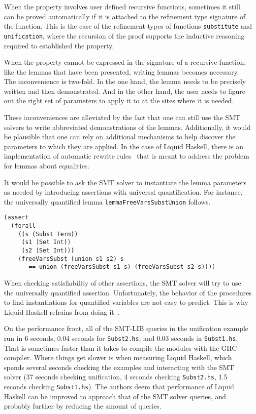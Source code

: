 \documentclass[sigconf, anonymous, review]{acmart}
\newcommand{\tc}[1]{{\small\texttt{#1}}}
\begin{document}
When the property involves user defined recursive functions,
sometimes it still can be proved automatically if it is attached to the
refinement type signature of the function. This is the case of the refinement
types of functions \tc{substitute} and \tc{unification}, where the recursion
of the proof supports the inductive reasoning required to established the
property.

When the property cannot be expressed in the signature of a recursive function,
like the lemmas that have been presented, writing lemmas becomes necessary. The
inconvenience is two-fold. In the one hand, the lemma needs to be precisely
written and then demonstrated. And in the other hand, the user needs to figure
out the right set of parameters to apply it to at the sites where it is needed.

These inconveniences are alleviated by the fact that one can still use the
SMT solvers to write abbreviated demonstrations of the lemmas. Additionally,
it would be plausible that one can rely on additional mechanisms to help
discover the parameters to which they are applied. In the case of Liquid
Haskell, there is an implementation of automatic rewrite rules~\cite{grannan22}
that is meant to address the problem for lemmas about equalities.

It would be possible to ask the SMT solver to instantiate the lemma parameters
as needed by introducing assertions with universal quantification. For instance,
the universally quantified lemma \tc{lemma\-FreeVars\-Subst\-Union} follows.

\begin{verbatim}
(assert
  (forall
    ((s (Subst Term))
     (s1 (Set Int))
     (s2 (Set Int)))
    (freeVarsSubst (union s1 s2) s
       == union (freeVarsSubst s1 s) (freeVarsSubst s2 s))))
\end{verbatim}

When checking satisfiability of other assertions, the SMT solver
will try to use the universally quantified assertion. Unfortunately, the
behavior of the procedures to find instantiations for quantified variables are
not easy to predict. This is why Liquid Haskell refrains from doing it~\cite{vazou13}.

On the performance front, all of the SMT-LIB queries in the unification example run
in 6 seconds, 0.04 seconds for \tc{Subst2.hs}, and 0.03 seconds in \tc{Subst1.hs}.
That is sometimes faster than it takes to compile the modules with the GHC compiler.
Where things get slower is when measuring Liquid
Haskell, which spends several seconds checking the examples and interacting with the
SMT solver (37 seconds checking unification, 4 seconds checking \tc{Subst2.hs},
1.5 seconds checking \tc{Subst1.hs}). The authors deem that performance of Liquid Haskell
can be improved to approach that of the SMT solver queries, and probably further by
reducing the amount of queries.
\end{document}
